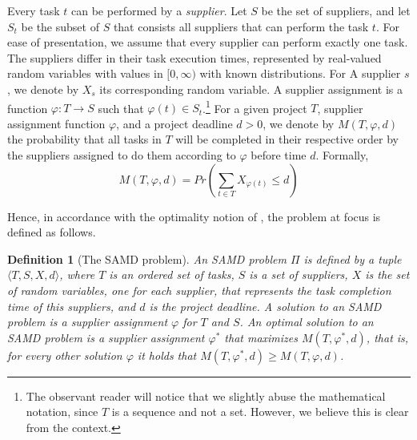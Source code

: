 \documentclass[letterpaper]{article} %
\newtheorem{definition}{Definition}
\newcommand{\samd}{\ac{SAMD}\xspace}
\begin{document}
Every task $t$ can be performed by a \emph{supplier}. 
Let $S$ be the set of suppliers, and let $S_t$ be the subset of $S$ that consists all suppliers that 
can perform the task $t$. For ease of presentation, we assume that every supplier can perform exactly one task. The suppliers differ in their task execution times, represented by real-valued random variables with values in $[0, \infty)$ with known distributions. For A supplier $s$, we denote by $X_s$ its corresponding random variable. 
A supplier assignment is a function $\varphi: T\rightarrow S$ such that $\varphi(t)\in S_t$.\footnote{The observant reader will notice that we slightly abuse the mathematical notation, since $T$ is a sequence and not a set. However, we believe this is clear from the context.}
For a given project $T$, supplier assignment function $\varphi$, and a project deadline $d>0$, we denote by 
$M(T, \varphi, d)$ the probability that 
all tasks in $T$ will be completed in their respective order by the suppliers assigned to do them according to $\varphi$ 
before time $d$. Formally, 
\begin{equation}
M(T, \varphi, d) = Pr\left(\sum_{t\in T} X_{\varphi(t)}\leq d\right) 
 \label{eq:objective}
\end{equation}

Hence, in accordance with the optimality notion of \citeauthor{frank1969shortest}, 
the problem at focus is defined as follows.
\begin{definition}[The \samd problem]
An \samd problem $\Pi$ is defined by a tuple 
 $\langle T, S, X, d\rangle$, 
 where $T$ is an ordered set of tasks, 
 $S$ is a set of suppliers, 
 $X$ is the set of random variables, one for each supplier, that represents the task completion time of this suppliers,
 and $d$ is the project deadline. 
 A solution to an \samd problem is a supplier assignment $\varphi$ for $T$ and $S$. An optimal solution to an \samd problem is
 a supplier assignment $\varphi^*$ that maximizes $M(T, \varphi^*, d)$, that is, for every other solution  $\varphi$ it holds that $M(T, \varphi^*, d)\geq M(T, \varphi, d)$. 
\end{definition}
 
\end{document}
